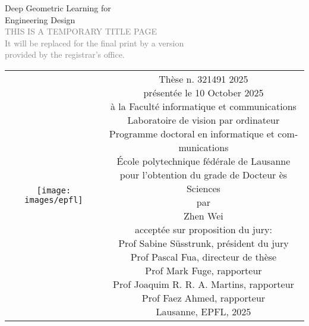 \begin{titlepage}
\begin{otherlanguage}{french}
\begin{center}
\sffamily


\null\vspace{2cm}
{\huge Deep Geometric Learning for \\[12pt] Engineering Design} \\[24pt] 
\textcolor{gray}{\small{THIS IS A TEMPORARY TITLE PAGE \\ It will be replaced for the final print by a version \\ provided by the registrar's office.}}
    
\vfill

\begin{tabular} {cc}
\parbox{0.3\textwidth}{\texttt{[image: images/epfl]}}
&
\parbox{0.7\textwidth}{%
	Thèse n. 321491 2025\\
	présentée le 10 October 2025\\
	à la Faculté informatique et communications\\
	Laboratoire de vision par ordinateur\\
	Programme doctoral en informatique et communications\\
%
	École polytechnique fédérale de Lausanne\\[6pt]
	pour l'obtention du grade de Docteur ès Sciences\\
	par\\ [4pt]
	\null \hspace{3em} Zhen Wei\\[9pt]
%
\small
acceptée sur proposition du jury:\\[4pt]
%
    Prof Sabine Süsstrunk, président du jury\\
    Prof Pascal Fua, directeur de thèse\\
    Prof Mark Fuge, rapporteur\\
    Prof Joaquim R. R. A. Martins, rapporteur\\
    Prof Faez Ahmed, rapporteur\\[12pt]
%
Lausanne, EPFL, 2025}
\end{tabular}
\end{center}
\vspace{2cm}
\end{otherlanguage}
\end{titlepage}



